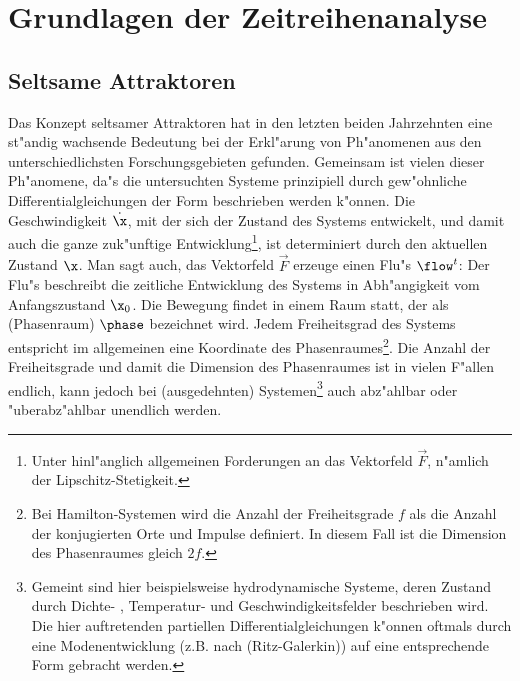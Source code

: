 \clearpage
\chapter{Grundlagen der Zeitreihenanalyse}



\section{Seltsame Attraktoren}
\label{chapdynsystems}

Das Konzept seltsamer Attraktoren hat in den letzten beiden Jahrzehnten eine st"andig
wachsende Bedeutung bei der Erkl"arung von Ph"anomenen aus den unterschiedlichsten
Forschungsgebieten gefunden. Gemeinsam ist vielen dieser Ph"anomene, da"s die untersuchten
Systeme prinzipiell durch gew"ohnliche Differentialgleichungen der Form
beschrieben werden k"onnen. Die Geschwindigkeit $\dot\x$, mit der sich der Zustand des
Systems entwickelt, und damit auch die ganze zuk"unftige Entwicklung\footnote{Unter
  hinl"anglich allgemeinen Forderungen an das Vektorfeld $\vec F$, n"amlich der
  Lipschitz-Stetigkeit.}, ist determiniert durch den aktuellen Zustand $\x$. Man sagt
auch, das Vektorfeld $\vec F$ erzeuge einen Flu"s $\flow^t$:
Der Flu"s beschreibt die zeitliche Entwicklung des Systems in Abh"angigkeit vom
Anfangszustand $\x_0$.  Die Bewegung findet in einem Raum statt, der als
\begriff(Phasenraum) $\phase$ bezeichnet wird. Jedem Freiheitsgrad des Systems entspricht
im allgemeinen eine Koordinate des Phasenraumes\footnote{Bei Hamilton-Systemen wird die
  Anzahl der Freiheitsgrade $f$ als die Anzahl der konjugierten Orte und Impulse
  definiert. In diesem Fall ist die Dimension des Phasenraumes gleich $2f$.}. Die Anzahl
der Freiheitsgrade und damit die Dimension des Phasenraumes ist in vielen F"allen endlich,
kann jedoch bei \naja(ausgedehnten) Systemen\footnote{Gemeint sind hier beispielsweise
  hydrodynamische Systeme, deren Zustand durch Dichte- , Temperatur- und
  Geschwindigkeitsfelder beschrieben wird. Die hier auftretenden partiellen
  Differentialgleichungen k"onnen oftmals durch eine Modenentwicklung (z.B. nach
  \autor(Ritz-Galerkin)) auf eine  entsprechende Form gebracht werden.}
auch abz"ahlbar oder "uberabz"ahlbar unendlich werden.

